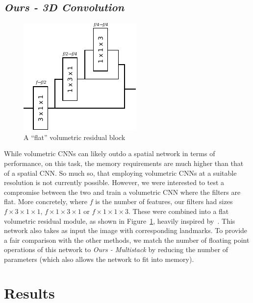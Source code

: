\subsection{\textit{Ours - 3D Convolution}}

\begin{figure}
  \centering
  \includegraphics[width=0.3\linewidth]{img/volumetric_residual.pdf}
  \caption{A ``flat'' volumetric residual block}
  \label{fig:flat_vol_residual}
\end{figure}

While volumetric CNNs can likely outdo a spatial network in terms of
performance, on this task, the memory requirements are much higher
than that of a spatial CNN. So much so, that employing volumetric CNNs
at a suitable resolution is not currently possible. However, we were
interested to test a compromise between the two and train a volumetric
CNN where the filters are flat. More concretely, where $f$ is the
number of features, our filters had sizes $f\times 3\times 1\times 1$,
$f\times 1\times 3\times 1$ or $f\times 1\times 1\times 3$. These were
combined into a flat volumetric residual module, as shown in
Figure~\ref{fig:flat_vol_residual}, heavily inspired
by~\cite{qiu2017learning}. This network also takes as input the image
with corresponding landmarks. To provide a fair comparison with the
other methods, we match the number of floating point operations of
this network to \textit{Ours - Multistack} by reducing the number of
parameters (which also allows the network to fit into memory).



\section{Results}

